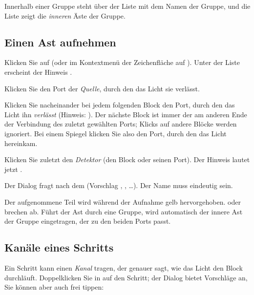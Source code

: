 Innerhalb einer Gruppe steht über der Liste  mit dem Namen der Gruppe, und die
Liste zeigt die \emph{inneren} Äste der Gruppe.

\subsection{Einen Ast aufnehmen}\label{sec:workflow-ast-aufnehmen}

\begin{schritte}
  \item Klicken Sie auf  (oder im Kontextmenü der Zeichenfläche auf
        ). Unter der Liste erscheint der Hinweis .
  \item Klicken Sie den Port der \emph{Quelle}, durch den das Licht sie verlässt.
  \item Klicken Sie nacheinander bei jedem folgenden Block den Port, durch den das Licht ihn
        \emph{verlässt} (Hinweis: ). Der nächste Block ist immer der am anderen Ende der Verbindung
        des zuletzt gewählten Ports; Klicks auf andere Blöcke werden ignoriert. Bei einem Spiegel
        klicken Sie also den Port, durch den das Licht hereinkam.
  \item Klicken Sie zuletzt den \emph{Detektor} (den Block oder seinen Port). Der Hinweis lautet
        jetzt .
  \item Der Dialog  fragt nach dem  (Vorschlag
        , , …). Der Name muss eindeutig sein.
\end{schritte}

Der aufgenommene Teil wird während der Aufnahme gelb hervorgehoben.  oder
 brechen ab. Führt der Ast durch eine Gruppe, wird automatisch der innere Ast der
Gruppe eingetragen, der zu den beiden Ports passt.

\subsection{Kanäle eines Schritts}\label{sec:workflow-kanaele}

Ein Schritt kann einen \emph{Kanal} tragen, der genauer sagt, wie das Licht den Block durchläuft.
Doppelklicken Sie in  auf den Schritt; der Dialog  bietet
Vorschläge an, Sie können aber auch frei tippen:

